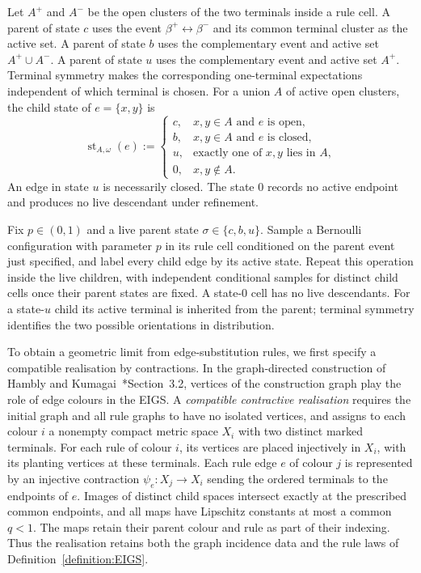 Let $A^+$ and $A^-$ be the open clusters of the two terminals inside a rule cell.
A parent of state $c$ uses the event $\beta^+\leftrightarrow\beta^-$ and its common terminal cluster as the active set.
A parent of state $b$ uses the complementary event and active set $A^+\cup A^-$.
A parent of state $u$ uses the complementary event and active set $A^+$.
Terminal symmetry makes the corresponding one-terminal expectations independent of which terminal is chosen.
For a union $A$ of active open clusters, the child state of $e=\{x,y\}$ is
\[
 \operatorname{st}_{A,\omega}(e):=
 \begin{cases}
 c,&x,y\in A\text{ and }e\text{ is open},\\
 b,&x,y\in A\text{ and }e\text{ is closed},\\
 u,&\text{exactly one of }x,y\text{ lies in }A,\\
 0,&x,y\notin A.
 \end{cases}
\]
An edge in state $u$ is necessarily closed.
The state $0$ records no active endpoint and produces no live descendant under refinement.


\begin{definition}\label{def:random-eigs}
Fix $p\in(0,1)$ and a live parent state $\sigma\in\{c,b,u\}$. Sample a Bernoulli configuration with parameter $p$ in its rule cell conditioned on the parent event just specified, and label every child edge by its active state. Repeat this operation inside the live children, with independent conditional samples for distinct child cells once their parent states are fixed. A state-$0$ cell has no live descendants. For a state-$u$ child its active terminal is inherited from the parent; terminal symmetry identifies the two possible orientations in distribution.
\end{definition}

To obtain a geometric limit from edge-substitution rules, we first specify a compatible realisation by contractions.
In the graph-directed construction of Hambly and Kumagai~\cite{hambly2010diffusion}*{Section~3.2}, vertices of the construction graph play the role of edge colours in the EIGS.
A \emph{compatible contractive realisation} requires the initial graph and all rule graphs to have no isolated vertices, and assigns to each colour $i$ a nonempty compact metric space $X_i$ with two distinct marked terminals.
For each rule of colour $i$, its vertices are placed injectively in $X_i$, with its planting vertices at these terminals.
Each rule edge $e$ of colour $j$ is represented by an injective contraction $\psi_e:X_j\longrightarrow X_i$ sending the ordered terminals to the endpoints of $e$.
Images of distinct child spaces intersect exactly at the prescribed common endpoints, and all maps have Lipschitz constants at most a common $q<1$.
The maps retain their parent colour and rule as part of their indexing.
Thus the realisation retains both the graph incidence data and the rule laws of Definition~\ref{definition:EIGS}.

